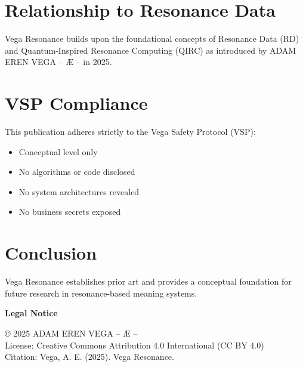 \documentclass[12pt,a4paper]{article}
\begin{document}
\section{Relationship to Resonance Data}
Vega Resonance builds upon the foundational concepts of Resonance Data (RD) and 
Quantum-Inspired Resonance Computing (QIRC) as introduced by ADAM EREN VEGA – Æ – in 2025.

\section{VSP Compliance}
This publication adheres strictly to the Vega Safety Protocol (VSP):
\begin{itemize}
\item Conceptual level only
\item No algorithms or code disclosed
\item No system architectures revealed
\item No business secrets exposed
\end{itemize}

\section{Conclusion}
Vega Resonance establishes prior art and provides a conceptual foundation for future 
research in resonance-based meaning systems.

\vspace{1cm}
\noindent\textbf{Legal Notice}

\noindent © 2025 ADAM EREN VEGA – Æ –\\
License: Creative Commons Attribution 4.0 International (CC BY 4.0)\\
Citation: Vega, A. E. (2025). Vega Resonance.
\end{document}
